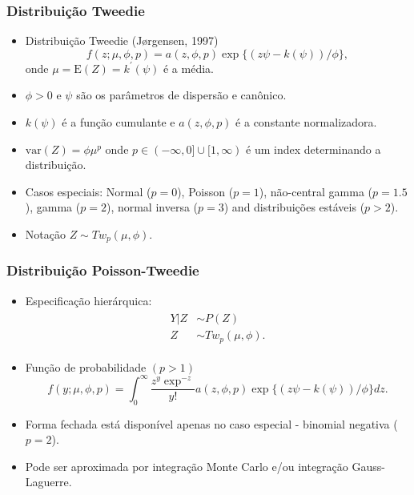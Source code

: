 \documentclass[10pt, aspectratio=169]{beamer}\usepackage[]{graphicx}\usepackage[]{color}
\begin{document}
\begin{frame}[c]
\frametitle{Distribuição Tweedie}
\begin{itemize}
\item Distribuição Tweedie (J{\o}rgensen, 1997)
\begin{equation*}
\label{distri}
f(z; \mu, \phi, p) = a(z,\phi,p) \exp\{(z\psi - k(\psi))/\phi\},
\end{equation*}
onde $\mu = \mathrm{E}(Z) = k^{\prime}(\psi)$ é a média. 
\item $\phi > 0$ e $\psi$ são os parâmetros de dispersão e canônico.
\item $k(\psi)$ é a função cumulante e $a(z,\phi, p)$ é a constante normalizadora.
\item $\mathrm{var}(Z) = \phi \mu^p$ onde $p \in (-\infty  ,0] \cup [1,\infty)$ é 
um index determinando a distribuição.
\item Casos especiais: Normal ($p=0$), Poisson ($p=1$), não-central gamma ($p=1.5$), gamma ($p=2$), normal inversa ($p=3$) and distribuições estáveis ($p > 2$).
\item Notação $Z \sim Tw_p(\mu, \phi)$.
\end{itemize}
\end{frame}

\begin{frame}[c]
\frametitle{Distribuição Poisson-Tweedie}
\begin{itemize}
\item Especificação hierárquica:
\begin{align}
\begin{split}
\label{conditional}
Y|Z &\sim P(Z) \\ 
Z &\sim Tw_p(\mu, \phi). \nonumber
\end{split}
\end{align}
\item Função de probabilidade $(p > 1)$
\begin{equation*}
f(y;\mu,\phi,p) = \int_0^\infty \frac{z^y \exp^{-z}}{y!} a(z,\phi,p) \exp\{(z\psi - k(\psi))/\phi\} dz.
\end{equation*}
\item Forma fechada está disponível apenas no caso especial - binomial negativa ($p=2$).
\item Pode ser aproximada por integração Monte Carlo e/ou integração Gauss-Laguerre.
\end{itemize}
\end{frame}
\end{document}
